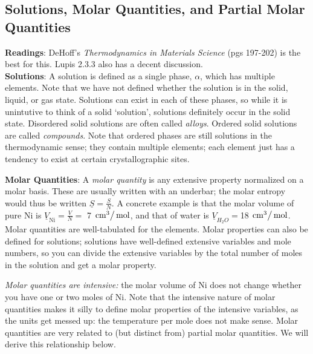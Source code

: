 \documentclass[12pt]{article}
\begin{document}
\subsection{Solutions, Molar Quantities, and Partial Molar Quantities}
\textbf{Readings}: DeHoff{'}s \textit{ Thermodynamics in Materials Science} (pgs 197-202) is the best for this. Lupis 2.3.3 also has a decent discussion.\\
\textbf{Solutions}: A solution is defined as a single phase, $\alpha$, which has multiple elements. Note that we have not defined whether the solution is in the solid, liquid, or gas state. Solutions can exist in each of these phases, so while it is unintutive to think of a solid `solution', solutions definitely occur in the solid state. Disordered solid solutions are often called \emph{alloys}. Ordered solid solutions are called \emph{compounds}. Note that ordered phases are still solutions in the thermodynamic sense; they contain multiple elements; each element just has a tendency to exist at certain crystallographic sites.

\textbf{Molar Quantities}: A \emph{molar quantity} is any extensive property normalized on a molar basis. These are usually written with an underbar; the molar entropy would thus be written $\underline{S}=\frac{S}{N}$. A concrete example is that the molar volume of pure Ni is $\underline{V}_{\text{Ni}}=\frac{V}{N}=$ 7 $\left.\text{cm}^3\right/\text{mol}$, and that of water is $\underline{V}_{H_2O}=$18 $\left.\text{cm}^3\right/\text{mol}$. Molar quantities are well-tabulated for the elements. Molar properties can also be defined for solutions; solutions have well-defined extensive variables and mole numbers, so you can divide the extensive variables by the total number of moles in the solution and get a molar property.

\emph{Molar quantities are intensive:} the molar volume of Ni does not change whether you have one or two moles of Ni. Note that the intensive nature of molar quantities makes it silly to define molar properties of the intensive variables, as the units get messed up: the temperature per mole does not make sense. Molar quantities are very related to (but distinct from) partial molar quantities. We will derive this relationship below.
\end{document}
